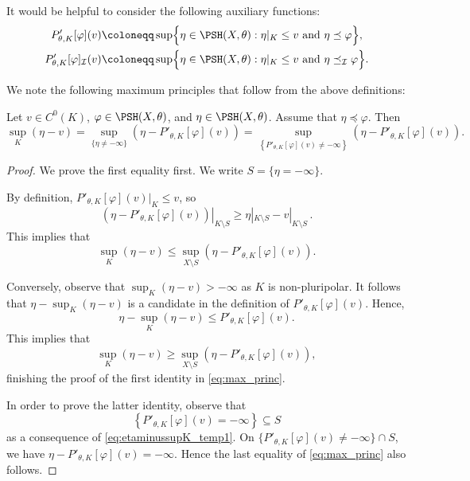 It would be helpful to consider the following auxiliary functions:
\[
\begin{aligned}
    P'_{\theta,K}[\varphi](v)\coloneqq & \sup \Bigl\{ \eta \in \PSH(X,\theta): \eta|_K \leq v  \textup{ and } \eta\preceq \varphi\Bigr\},\\
    P'_{\theta,K}[\varphi]_{\mathcal{I}}(v)\coloneqq & \sup \Bigl\{ \eta \in \PSH(X,\theta): \eta|_K \leq v  \textup{ and } \eta\preceq_{\mathcal{I}} \varphi\Bigr\}.
\end{aligned}
\]

We note the following maximum principles that follow from the above definitions:
\begin{lemma}\label{lma:max_princ} Let $v\in C^0(K)$, $\varphi\in \PSH(X,\theta)$, and $\eta \in \PSH(X,\theta)$.
Assume that $\eta \preceq \varphi$. Then
\begin{equation}\label{eq:max_princ}
\sup_K (\eta-v) = \sup_{\{\eta\neq -\infty\}} \left(\eta - P'_{\theta,K}[\varphi](v)\right)=\sup_{\left\{P'_{\theta,K}[\varphi](v)\neq -\infty\right\}} \left(\eta - P'_{\theta,K}[\varphi](v)\right).
\end{equation}
\end{lemma}
\begin{proof}
We prove the first equality first. We write $S=\{\eta=-\infty\}$.

By definition, $P'_{\theta,K}[\varphi](v)|_K\leq v$, so
\[
\left.\left(\eta-P'_{\theta,K}[\varphi](v)\right)\right|_{K\setminus S}\geq \eta|_{K\setminus S}-v|_{K\setminus S}\,.
\]
This implies that
\[
\sup_K (\eta-v) \leq \sup_{X\setminus S} \left(\eta - P'_{\theta,K}[\varphi](v)\right).
\]

Conversely, observe that $\sup_K(\eta-v)>-\infty$ as $K$ is non-pluripolar. It follows that $\eta-\sup_K (\eta-v)$ is a candidate in the definition of $P'_{\theta,K}[\varphi](v)$. Hence,
\begin{equation}\label{eq:etaminussupK_temp1}
\eta-\sup_K (\eta-v)\leq P'_{\theta,K}[\varphi](v).
\end{equation}
This implies that
\[
\sup_K (\eta-v) \geq \sup_{X\setminus S} \left(\eta - P'_{\theta,K}[\varphi](v)\right),
\]
finishing the proof of the first identity in \eqref{eq:max_princ}.

In order to prove the latter identity, observe that
\[
\left\{P'_{\theta,K}[\varphi](v) =-\infty\right\} \subseteq S
\]
as a consequence of \eqref{eq:etaminussupK_temp1}. On $\{P'_{\theta,K}[\varphi](v)\neq -\infty\}\cap S$, we have $\eta-P'_{\theta,K}[\varphi](v)=-\infty$. Hence the last equality of \eqref{eq:max_princ} also follows.
\end{proof}

